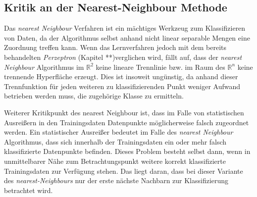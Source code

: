 \documentclass[fontsize=11pt]{scrartcl}
\begin{document}
            \subsection{Kritik an der Nearest-Neighbour Methode}
                Das \emph{nearest Neighbour} Verfahren ist ein mächtiges Werkzeug zum Klassifizieren von Daten, da der Algorithmus selbst anhand nicht linear separable Mengen eine Zuordnung treffen kann.\cite{ertel2016} Wenn das Lernverfahren jedoch mit dem bereits behandelten \emph{Perzeptron} (Kapitel **)verglichen wird, fällt auf, dass der \emph{nearest Neighbour} Algorithmus im $\mathbb{R}^2$ keine lineare Trennlinie bzw. im Raum des $\mathbb{R}^n$ keine trennende Hyperfläche erzeugt. Dies ist insoweit ungünstig, da anhand dieser Trennfunktion für jeden weiteren zu klassifizierenden Punkt weniger Aufwand betrieben werden muss, die zugehörige Klasse zu ermitteln.\cite{ertel2016}\par
                Weiterer Kritikpunkt des nearest Neighbour ist, dass im Falle von statistischen Ausreißern in den Trainingsdaten Datenpunkte möglicherweise falsch zugeordnet werden. Ein statistischer Ausreißer bedeutet im Falle des \emph{nearest Neighbour} Algorithmus, dass sich innerhalb der Trainingsdaten ein oder mehr falsch klassifizierte Datenpunkte befinden. Dieses Problem besteht selbst dann, wenn in unmittelbarer Nähe zum Betrachtungspunkt weitere korrekt klassifizierte Trainingsdaten zur Verfügung stehen. Das liegt daran, dass bei dieser Variante des \emph{nearest-Neighbours} nur der erste nächste Nachbarn zur Klassifizierung betrachtet wird.\cite{ertel2016}\par
                         
\end{document}
